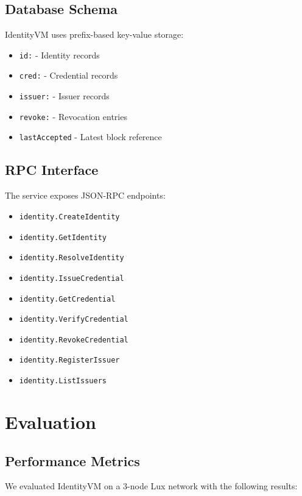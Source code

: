 \documentclass[11pt,twocolumn]{article}
\begin{document}
\subsection{Database Schema}

IdentityVM uses prefix-based key-value storage:

\begin{itemize}
\item \texttt{id:} - Identity records
\item \texttt{cred:} - Credential records
\item \texttt{issuer:} - Issuer records
\item \texttt{revoke:} - Revocation entries
\item \texttt{lastAccepted} - Latest block reference
\end{itemize}

\subsection{RPC Interface}

The service exposes JSON-RPC endpoints:

\begin{itemize}
\item \texttt{identity.CreateIdentity}
\item \texttt{identity.GetIdentity}
\item \texttt{identity.ResolveIdentity}
\item \texttt{identity.IssueCredential}
\item \texttt{identity.GetCredential}
\item \texttt{identity.VerifyCredential}
\item \texttt{identity.RevokeCredential}
\item \texttt{identity.RegisterIssuer}
\item \texttt{identity.ListIssuers}
\end{itemize}

\section{Evaluation}

\subsection{Performance Metrics}

We evaluated IdentityVM on a 3-node Lux network with the following results:
\end{document}
